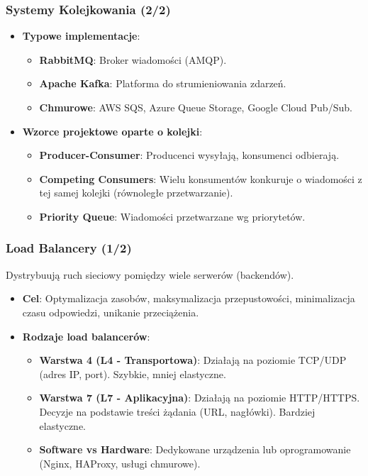 \documentclass[aspectratio=169,xcolor=table]{beamer}
\begin{document}
\begin{frame}
  \frametitle{Systemy Kolejkowania (2/2)}
  \begin{itemize}
    \item \textbf{Typowe implementacje}:
        \begin{itemize}
            \item \textbf{RabbitMQ}: Broker wiadomości (AMQP).
            \item \textbf{Apache Kafka}: Platforma do strumieniowania zdarzeń.
            \item \textbf{Chmurowe}: AWS SQS, Azure Queue Storage, Google Cloud Pub/Sub.
        \end{itemize}
    \item \textbf{Wzorce projektowe oparte o kolejki}:
        \begin{itemize}
            \item \textbf{Producer-Consumer}: Producenci wysyłają, konsumenci odbierają.
            \item \textbf{Competing Consumers}: Wielu konsumentów konkuruje o wiadomości z tej samej kolejki (równoległe przetwarzanie).
            \item \textbf{Priority Queue}: Wiadomości przetwarzane wg priorytetów.
        \end{itemize}
  \end{itemize}
\end{frame}

\begin{frame}
  \frametitle{Load Balancery (1/2)}
  Dystrybuują ruch sieciowy pomiędzy wiele serwerów (backendów).
  \begin{itemize}
    \item \textbf{Cel}: Optymalizacja zasobów, maksymalizacja przepustowości, minimalizacja czasu odpowiedzi, unikanie przeciążenia.
    \item \textbf{Rodzaje load balancerów}:
        \begin{itemize}
            \item \textbf{Warstwa 4 (L4 - Transportowa)}: Działają na poziomie TCP/UDP (adres IP, port). Szybkie, mniej elastyczne.
            \item \textbf{Warstwa 7 (L7 - Aplikacyjna)}: Działają na poziomie HTTP/HTTPS. Decyzje na podstawie treści żądania (URL, nagłówki). Bardziej elastyczne.
            \item \textbf{Software vs Hardware}: Dedykowane urządzenia lub oprogramowanie (Nginx, HAProxy, usługi chmurowe).
        \end{itemize}
  \end{itemize}
\end{frame}
\end{document}
